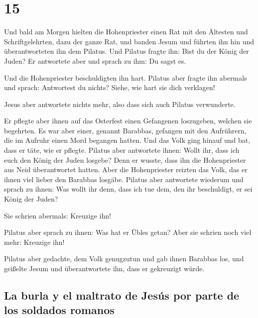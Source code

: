 \hypertarget{section-14}{%
\section{15}\label{section-14}}

 Und bald am Morgen hielten die Hohenpriester einen Rat
mit den Ältesten und Schriftgelehrten, dazu der ganze Rat, und banden
Jesum und führten ihn hin und überantworteten ihn dem Pilatus.
 Und Pilatus fragte ihn: Bist du der König der Juden? Er
antwortete aber und sprach zu ihm: Du sagst es.

 Und die Hohenpriester beschuldigten ihn hart.
 Pilatus aber fragte ihn abermals und sprach: Antwortest
du nichts? Siehe, wie hart sie dich verklagen!

 Jesus aber antwortete nichts mehr, also dass sich auch
Pilatus verwunderte.

 Er pflegte aber ihnen auf das Osterfest einen Gefangenen
loszugeben, welchen sie begehrten.  Es war aber einer,
genannt Barabbas, gefangen mit den Aufrührern, die im Aufruhr einen Mord
begangen hatten.  Und das Volk ging hinauf und bat, dass
er täte, wie er pflegte.  Pilatus aber antwortete ihnen:
Wollt ihr, dass ich euch den König der Juden losgebe? 
Denn er wusste, dass ihn die Hohenpriester aus Neid überantwortet
hatten.  Aber die Hohenpriester reizten das Volk, das er
ihnen viel lieber den Barabbas losgäbe.  Pilatus aber
antwortete wiederum und sprach zu ihnen: Was wollt ihr denn, dass ich
tue dem, den ihr beschuldigt, er sei König der Juden?

 Sie schrien abermals: Kreuzige ihn!

 Pilatus aber sprach zu ihnen: Was hat er Übles getan?
Aber sie schrien noch viel mehr: Kreuzige ihn!

 Pilatus aber gedachte, dem Volk genugzutun und gab ihnen
Barabbas los, und geißelte Jesum und überantwortete ihn, dass er
gekreuzigt würde.

\hypertarget{la-burla-y-el-maltrato-de-jesuxfas-por-parte-de-los-soldados-romanos}{%
\subsection{La burla y el maltrato de Jesús por parte de los soldados
romanos}\label{la-burla-y-el-maltrato-de-jesuxfas-por-parte-de-los-soldados-romanos}}

